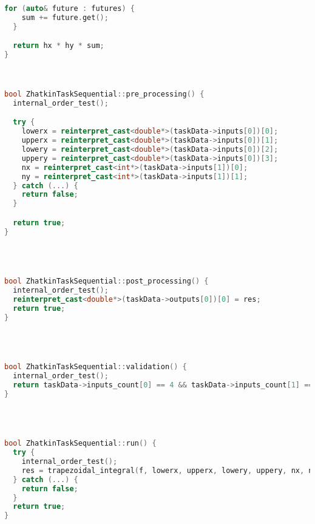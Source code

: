 \documentclass[]{article}
\theoremstyle{remark}
\theoremstyle{definition}
\begin{document}
\begin{lstlisting}[language=C++]
  for (auto& future : futures) {
    sum += future.get();
  }

  return hx * hy * sum;
}



bool ZhatkinTaskSequential::pre_processing() {
  internal_order_test();

  try {
    lowerx = reinterpret_cast<double*>(taskData->inputs[0])[0];
    upperx = reinterpret_cast<double*>(taskData->inputs[0])[1];
    lowery = reinterpret_cast<double*>(taskData->inputs[0])[2];
    uppery = reinterpret_cast<double*>(taskData->inputs[0])[3];
    nx = reinterpret_cast<int*>(taskData->inputs[1])[0];
    ny = reinterpret_cast<int*>(taskData->inputs[1])[1];
  } catch (...) {
    return false;
  }

  return true;
}




bool ZhatkinTaskSequential::post_processing() {
  internal_order_test();
  reinterpret_cast<double*>(taskData->outputs[0])[0] = res;
  return true;
}




bool ZhatkinTaskSequential::validation() {
  internal_order_test();
  return taskData->inputs_count[0] == 4 && taskData->inputs_count[1] == 2 && taskData->outputs_count[0] == 1;
}




bool ZhatkinTaskSequential::run() {
  try {
    internal_order_test();
    res = trapezoidal_integral(f, lowerx, upperx, lowery, uppery, nx, ny);
  } catch (...) {
    return false;
  }
  return true;
}
                            
\end{lstlisting}
\end{document}
